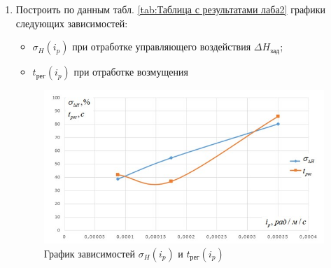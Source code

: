 \documentclass[a4paper,12pt]{article}
\begin{document}
\begin{enumerate}
                            
                        \item Построить по данным табл. \ref{tab:Таблица с результатами лаба2} графики следующих зависимостей:
                            \begin{itemize}
                                \item  $\sigma_{H}(i_p)$ при отработке управляющего воздействия $\Delta H_{зад}$;
                                \item  $t_{рег}(i_p)$  при отработке возмущения
                            \end{itemize}
                            \begin{figure}[H]
                                \centering
                                \includegraphics[widht=\linewidth]{img/10.jpg}
                                \caption{График зависимостей $\sigma_{H}(i_p)$ и $t_{рег}(i_p)$ }
                                \label{fig:my_label}
                            \end{figure}
                            

\end{enumerate}
\end{document}
